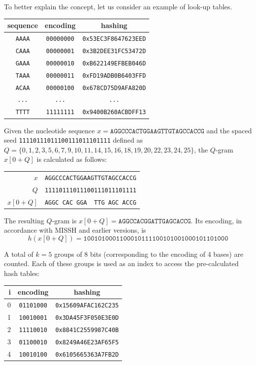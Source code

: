 \begin{example}
	To better explain the concept, let us consider an example of look-up tables. 
	\begin{center}
		\begin{tabular}{c c c}
			\textbf{sequence} & \textbf{encoding} & \textbf{hashing} \\
			\toprule
			\verb|AAAA| & \verb|00000000| & \verb|0x53EC3F8647623EED| \\
			\verb|CAAA| & \verb|00000001| & \verb|0x3B2DEE31FC53472D| \\
			\verb|GAAA| & \verb|00000010| & \verb|0xB622149EFBEB046D| \\
			\verb|TAAA| & \verb|00000011| & \verb|0xFD19ADB0B6403FFD| \\
			\verb|ACAA| & \verb|00000100| & \verb|0x678CD75D9AFA820D| \\
			\verb|...| & \verb|...| & \verb|...| \\
			\verb|TTTT| & \verb|11111111| & \verb|0x9400B260ACBDFF13| \\
			\bottomrule
		\end{tabular}
	\end{center}
	
	Given the nucleotide sequence $x = \texttt{AGGCCCACTGGAAGTTGTAGCCACCG}$ and the spaced seed \verb|11110111011100111011101111| defined as $Q = \{ 0, 1, 2, \allowbreak3, 5, 6, 7, 9, 10, 11, 14, 15, 16, 18, 19, 20, 22, 23, 24, 25 \}$, the $Q$-gram $x[0 + Q]$ is calculated as follows:
	\begin{center}
		\begin{tabular}{r || l}
			$x$ & \texttt{AGGCCCACTGGAAGTTGTAGCCACCG} \\
			$Q$ & \texttt{11110111011100111011101111} \\
			$x[0 + Q]$ & \texttt{AGGC\ CAC\ GGA\ \ TTG\ AGC\ ACCG} \\
		\end{tabular}
	\end{center}
	
	The resulting $Q$-gram is $x[0 + Q] = \texttt{AGGCCACGGATTGAGCACCG}$. Its encoding, in accordance with \acs{MISSH} and earlier versions, is \[ h(x[0 + Q]) = \texttt{1001010001100010111100101001000101101000} \]
	
	A total of $k = 5$ groups of 8 bits (corresponding to the encoding of 4 bases) are counted. Each of these groups is used as an index to access the pre-calculated hash tables:
	\begin{center}
		\begin{tabular}{r c c}
			\textbf{i} & \textbf{encoding} & \textbf{hashing} \\
			\toprule
			0 & \verb|01101000| & \verb|0x15609AFAC162C235| \\
			1 & \verb|10010001| & \verb|0x3DA45F3F050E3E0D| \\
			2 & \verb|11110010| & \verb|0x8841C2559987C40B| \\
			3 & \verb|01100010| & \verb|0x8249A46E23AF65F5| \\
			4 & \verb|10010100| & \verb|0x6105665363A7FB2D| \\
			\bottomrule
		\end{tabular}
	\end{center}
	

\end{example}
